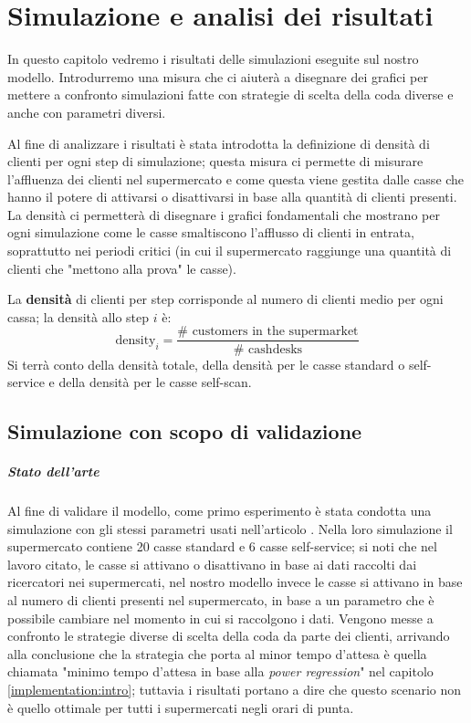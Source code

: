 \chapter{Simulazione e analisi dei risultati}
\label{chapter:simulation}

In questo capitolo vedremo i risultati delle simulazioni eseguite sul nostro modello. Introdurremo una misura che ci aiuterà a disegnare dei grafici per mettere a confronto simulazioni fatte con strategie di scelta della coda diverse e anche con parametri diversi.

\vspace*{1\baselineskip}

Al fine di analizzare i risultati è stata introdotta la definizione di densità di clienti per ogni step di simulazione; questa misura ci permette di misurare l'affluenza dei clienti nel supermercato e come questa viene gestita dalle casse che hanno il potere di attivarsi o disattivarsi in base alla quantità di clienti presenti. La densità ci permetterà di disegnare i grafici fondamentali che mostrano per ogni simulazione come le casse smaltiscono l'afflusso di clienti in entrata, soprattutto nei periodi critici (in cui il supermercato raggiunge una quantità di clienti che "mettono alla prova" le casse).

La \textbf{densità} di clienti per step corrisponde al numero di clienti medio per ogni cassa; la densità allo step $i$ è:
\begin{equation}
	\text{density}_i = \frac{\# \text{ customers in the supermarket}}{\# \text{ cashdesks}}
\end{equation}
Si terrà conto della densità totale, della densità per le casse standard o self-service e della densità per le casse self-scan.

\section{Simulazione con scopo di validazione}

\paragraph{Stato dell'arte}

Al fine di validare il modello, come primo esperimento è stata condotta una simulazione con gli stessi parametri usati nell'articolo \cite{article1}. Nella loro simulazione il supermercato contiene 20 casse standard e 6 casse self-service; si noti che nel lavoro citato, le casse si attivano o disattivano in base ai dati raccolti dai ricercatori nei supermercati, nel nostro modello invece le casse si attivano in base al numero di clienti presenti nel supermercato, in base a un parametro che è possibile cambiare nel momento in cui si raccolgono i dati. Vengono messe a confronto le strategie diverse di scelta della coda da parte dei clienti, arrivando alla conclusione che la strategia che porta al minor tempo d'attesa è quella chiamata "minimo tempo d'attesa in base alla \textit{power regression}" nel capitolo \ref{implementation:intro}; tuttavia i risultati portano a dire che questo scenario non è quello ottimale per tutti i supermercati negli orari di punta.

